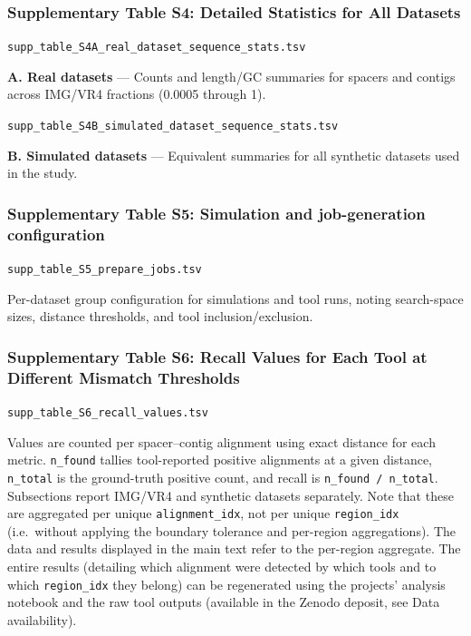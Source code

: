 \documentclass[
]{article}
\begin{document}
\subsubsection{Supplementary Table S4: Detailed Statistics for All
Datasets}\label{tbl-supp-simulation-params}

\texttt{supp\_table\_S4A\_real\_dataset\_sequence\_stats.tsv}

\textbf{A. Real datasets} --- Counts and length/GC summaries for spacers
and contigs across IMG/VR4 fractions (0.0005 through 1).

\texttt{supp\_table\_S4B\_simulated\_dataset\_sequence\_stats.tsv}

\textbf{B. Simulated datasets} --- Equivalent summaries for all
synthetic datasets used in the study.

\subsubsection{Supplementary Table S5: Simulation and job-generation
configuration}\label{tbl-supp-prepare-jobs}

\texttt{supp\_table\_S5\_prepare\_jobs.tsv}

Per-dataset group configuration for simulations and tool runs, noting
search-space sizes, distance thresholds, and tool inclusion/exclusion.

\subsubsection{Supplementary Table S6: Recall Values for Each Tool at
Different Mismatch Thresholds}\label{tbl-supp-recall}

\texttt{supp\_table\_S6\_recall\_values.tsv}

Values are counted per spacer--contig alignment using exact distance for
each metric. \texttt{n\_found} tallies tool-reported positive alignments
at a given distance, \texttt{n\_total} is the ground-truth positive
count, and recall is \texttt{n\_found\ /\ n\_total}. Subsections report
IMG/VR4 and synthetic datasets separately. Note that these are
aggregated per unique \texttt{alignment\_idx}, not per unique
\texttt{region\_idx} (i.e.~without applying the boundary tolerance and
per-region aggregations). The data and results displayed in the main
text refer to the per-region aggregate. The entire results (detailing
which alignment were detected by which tools and to which
\texttt{region\_idx} they belong) can be regenerated using the projects'
analysis notebook and the raw tool outputs (available in the Zenodo
deposit, see Data availability).
\end{document}

